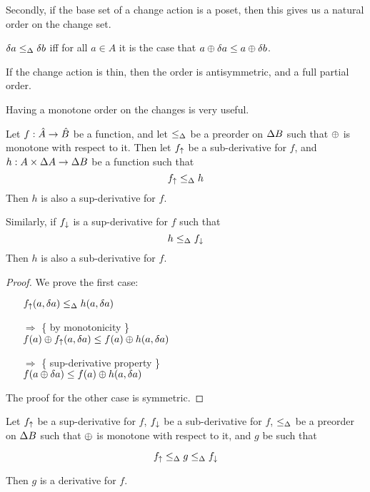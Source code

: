 Secondly, if the base set of a change action is a poset, then this gives us a natural
order on the change set.

\begin{defn}
  $\delta a \leq_\Delta \delta b$ iff for all $a \in A$ it is the case that $a \oplus \delta a \leq a \oplus \delta b$.
\end{defn}

If the change action is thin, then the order is antisymmetric, and a
full partial order.

Having a monotone order on the changes is very useful.

\begin{thm}
  Let $f: \hat{A} \rightarrow \hat{B}$ be a function, and let $\leq_\Delta$ be a preorder on $\Delta B$ such that $\oplus$ is monotone with
  respect to it. Then let $f_\uparrow$ be a sub-derivative for $f$, and $h: A \times
  \Delta A \rightarrow \Delta B$ be a function such that
  $$f_\uparrow \leq_\Delta h$$
  Then $h$ is also a sup-derivative for $f$.

  Similarly, if $f_\downarrow$ is a sup-derivative for $f$ such that 
  $$h \leq_\Delta f_\downarrow$$
  Then $h$ is also a sub-derivative for $f$.
\end{thm}
\ifproofs
\begin{proof}
  We prove the first case:
  \begin{itemize}
    \item[ ]$f_\uparrow(a, \delta a) \leq_\Delta h(a, \delta a)$
    \item[$\Rightarrow$]\{ by monotonicity \}\\
      $f(a) \oplus f_\uparrow(a, \delta a) \leq f(a) \oplus h(a, \delta a)$
    \item[$\Rightarrow$]\{ sup-derivative property \}\\
      $f(a \oplus \delta a) \leq f(a) \oplus h(a, \delta a)$
  \end{itemize}

  The proof for the other case is symmetric.
\end{proof}
\fi

\begin{thm}
  \label{thm:sandwich}
  Let $f_\uparrow$ be a sup-derivative for $f$, $f_\downarrow$ be a sub-derivative for $f$, $\leq_\Delta$ be a preorder on $\Delta B$ such that $\oplus$ is monotone with
  respect to it, and $g$ be such that

  $$f_\uparrow \leq_\Delta g \leq_\Delta f_\downarrow$$

  Then $g$ is a derivative for $f$.
\end{thm}

